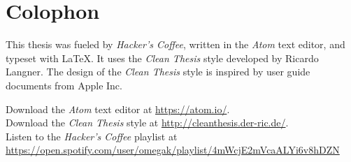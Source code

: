 
\pagestyle{empty}
\hfill\vfill
{}
\section*{Colophon}

This thesis was fueled by \emph{Hacker's Coffee}, written in the \emph{Atom} text editor, and typeset with \LaTeX.
It uses the \emph{Clean Thesis} style developed by Ricardo Langner.
The design of the \emph{Clean Thesis} style is inspired by user guide documents from Apple Inc.

Download the \emph{Atom} text editor at \url{https://atom.io/}. \\
Download the \emph{Clean Thesis} style at \url{http://cleanthesis.der-ric.de/}. \\
Listen to the \emph{Hacker's Coffee} playlist at \\
\url{https://open.spotify.com/user/omegak/playlist/4mWcjE2mVcaALYi6v8hDZN}
